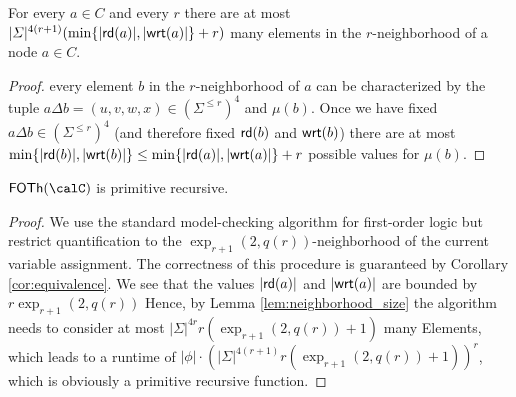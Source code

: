 


\begin{lemma}\label{lem:neighborhood_size}
	For every $a\in C$ and every $r$ there are at most $|\varSigma|^{4(r+1)} (\min\{|\mathsf{rd}(a)|, |\mathsf{wrt}(a)|\} + r)$ many elements in the $r$-neighborhood of a node $a\in C$. 
\end{lemma}
\begin{proof}
	every element $b$ in the $r$-neighborhood of $a$ can be characterized by the tuple $a\Delta b = (u,v, w, x)\in (\Sigma^{\leq r})^4$ and $\mu(b)$. Once we have  fixed  
	$a\Delta b \in (\Sigma^{\leq r})^4$ (and therefore fixed $\mathsf{rd}(b)$ and $\mathsf{wrt}(b)$) there are at most   $\min\{ |\mathsf{rd}(b)|, |\mathsf{wrt}(b)| \} \leq \min\{ |\mathsf{rd}(a)|, |\mathsf{wrt}(a)| \} + r$ possible values for $\mu(b)$.
\end{proof}

\begin{theorem}
	$\FOTh{\calC}$ is primitive recursive.
\end{theorem}
\begin{proof}
	We use the standard model-checking algorithm for first-order logic but restrict quantification to the $\exp_{r+1}(2,q(r))$-neighborhood of the current variable assignment. The correctness of this procedure is guaranteed by Corollary \ref{cor:equivalence}.
	We see that the values $|\mathsf{rd}(a)|$ and $|\mathsf{wrt}(a)|$ are bounded by $r\exp_{r+1}(2,q(r))$
	Hence, by Lemma \ref{lem:neighborhood_size}  the algorithm needs to consider at most $|\Sigma|^{4r} r(\exp_{r+1}(2,q(r)) +1)$ many Elements, which leads to a runtime of
	$|\phi| \cdot (|\Sigma|^{4(r+1)} r(\exp_{r+1}(2,q(r)) +1))^r$, which is obviously a primitive recursive function. 
\end{proof}